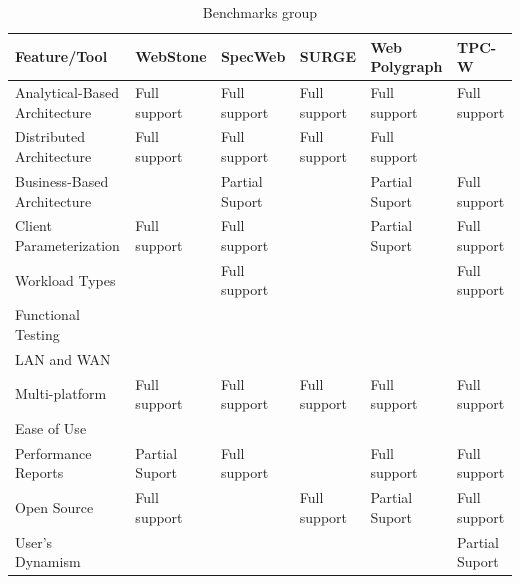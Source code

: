 \documentclass{report}
\begin{document}
\begin{table}[]
\centering
\caption{Benchmarks group}
\label{my-label}
\begin{tabular}{|l|l|l|l|l|l|}
\hline
\rowcolor[HTML]{EFEFEF} 
\textbf{Feature/Tool}         & \textbf{WebStone} & \textbf{SpecWeb} & \textbf{SURGE} & \textbf{Web Polygraph} & \textbf{TPC-W} \\ \hline
Analytical-Based Architecture & Full support      & Full support     & Full support   & Full support           & Full support   \\ \hline
Distributed Architecture      & Full support      & Full support     & Full support   & Full support           &                \\ \hline
Business-Based Architecture   &                   & Partial Suport   &                & Partial Suport         & Full support   \\ \hline
Client Parameterization       & Full support      & Full support     &                & Partial Suport         & Full support   \\ \hline
Workload Types                &                   & Full support     &                &                        & Full support   \\ \hline
Functional Testing            &                   &                  &                &                        &                \\ \hline
LAN and WAN                   &                   &                  &                &                        &                \\ \hline
Multi-platform                & Full support      & Full support     & Full support   & Full support           & Full support   \\ \hline
Ease of Use                   &                   &                  &                &                        &                \\ \hline
Performance Reports           & Partial Suport    & Full support     &                & Full support           & Full support   \\ \hline
Open Source                   & Full support      &                  & Full support   & Partial Suport         & Full support   \\ \hline
User’s Dynamism               &                   &                  &                &                        & Partial Suport \\ \hline
\end{tabular}
\end{table}
\end{document}
